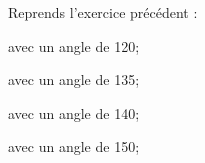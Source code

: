 Reprends l'exercice précédent :
\begin{myenumerate}
  \item avec un angle de 120\degres;
  \item avec un angle de 135\degres;
  \item avec un angle de 140\degres;
  \item avec un angle de 150\degres;
\end{myenumerate}